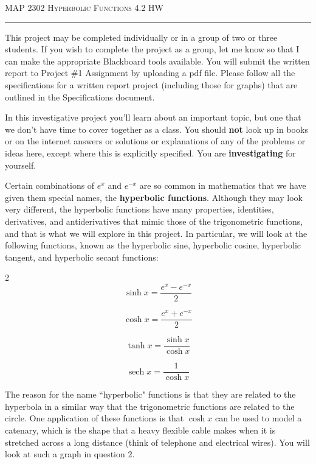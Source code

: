 \documentclass[12pt]{amsart}
\DeclareMathOperator{\sech}{sech}
\begin{document}
\thispagestyle{empty}

{\scshape MAP 2302} \hfill {\scshape \large Hyperbolic Functions} \hfill {4.2 HW\scshape }
 
\smallskip

\hrule

\bigskip

This project may be completed individually or in a group of two or three students.  If you wish to complete the project as a group, let me know so that I can make the appropriate Blackboard tools available.  You will submit the written report to Project \#1 Assignment by uploading a pdf file.  Please follow all the specifications for a written report project (including those for graphs) that are outlined in the Specifications document.

\bigskip

In this investigative project you'll learn about an important topic, but one that we don't have time to cover together as a class.  You should {\bf not} look up in books or on the internet answers or solutions or explanations of any of the problems or ideas here, except where this is explicitly specified.  You are {\bf investigating} for yourself.  

\medskip

Certain combinations of $e^x$ and $e^{-x}$ are so common in mathematics that we have given them special
names, the {\bf hyperbolic functions}. Although they may look very different, the hyperbolic functions
have many properties, identities, derivatives, and antiderivatives that mimic those of the trigonometric functions,
and that is what we will explore in this project. In particular, we will look at the following
functions, known as the hyperbolic sine, hyperbolic cosine, hyperbolic tangent, and hyperbolic
secant functions:
\begin{multicols}{2}
$$\sinh x = \frac{e^x - e^{-x}}{2}$$

$$\cosh x = \frac{e^x + e^{-x}}{2}$$

$$\tanh x = \frac{\sinh x}{\cosh x}$$

$$\sech x = \frac{1}{\cosh x}$$

\end{multicols}

The reason for the name ``hyperbolic" functions is that they are related to the hyperbola in a similar
way that the trigonometric functions are related to the circle. One application of these functions is
that $\cosh x$ can be used to model a catenary, which is the shape that a heavy flexible cable makes
when it is stretched across a long distance (think of telephone and electrical wires). You will look
at such a graph in question 2.
\end{document}
